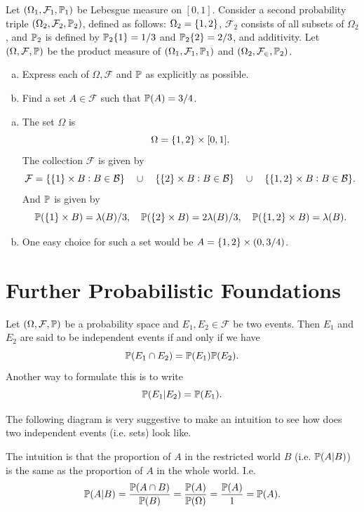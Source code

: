 \begin{problem}
	Let $ (\Omega_1,\mathcal{F}_1,\mathbb{P}_1) $ be Lebesgue measure on $ [0,1] $. Consider a second probability triple $ (\Omega_2, \mathcal{F}_2, \mathbb{P}_2) $, defined as follows: $ \Omega_2 = \{1,2\} $, $ \mathcal{F}_2 $ consists of all subsets of $ \Omega_2 $, and $ \mathbb{P}_2 $ is defined by $ \mathbb{P}_2\{1\} = 1/3 $ and $ \mathbb{P}_2\{2\} = 2/3 $, and additivity. Let $ (\Omega,\mathcal{F},\mathbb{P}) $ be the product measure of $ (\Omega_1, \mathcal{F}_1, \mathbb{P}_1) $ and $ (\Omega_2,\mathcal{F_2},\mathbb{P}_2) $.
	\begin{enumerate}[(a)]
		\item Express each of $ \Omega, \mathcal{F} $ and $ \mathbb{P} $ as explicitly as possible.
		\item Find a set $ A \in \mathcal{F} $ such that $ \mathbb{P}(A) = 3/4 $.
	\end{enumerate}
\end{problem}
\begin{solution}
	\begin{enumerate}[(a)]
		\item The set $ \Omega $ is 
		\[ \Omega = \{1,2\}\times [0,1]. \]
		The collection $ \mathcal{F} $ is given by
		\[ \mathcal{F} = \{\{1\}\times B: B \in\mathcal{B}\}\quad \cup\quad \{\{2\}\times B: B \in \mathcal{B}\} \quad\cup\quad \{\{1,2\}\times B: B \in \mathcal{B}\}. \]
		And $ \mathbb{P} $ is given by
		\[ \mathbb{P}(\{1\}\times B) = \lambda(B)/3,\quad \mathbb{P}(\{2\}\times B) = 2\lambda(B)/3,\quad \mathbb{P}(\{1,2\}\times B) = \lambda(B). \]
		\item One easy choice for such a set would be $ A = \{1,2\}\times(0,3/4) $.
	\end{enumerate}
\end{solution}
\newpage


\section{Further Probabilistic Foundations}
\begin{definition}
	Let $ (\Omega,\mathcal{F},\mathbb{P}) $ be a probability space and $ E_1,E_2 \in \mathcal{F} $ be two events. Then $ E_1 $ and $ E_2 $ are said to be independent events if and only if we have
	\[ \mathbb{P}(E_1\cap E_2) = \mathbb{P}(E_1)\mathbb{P}(E_2). \]
	Another way to formulate this is to write
	\[ \mathbb{P}(E_1 | E_2) = \mathbb{P}(E_1). \]
\end{definition}
\begin{remark}
	The following diagram is very suggestive to make an intuition to see how does two independent events (i.e. sets) look like.
	
	\FloatBarrier
	The intuition is that the proportion of $ A $ in the restricted world $ B $ (i.e. $ \mathbb{P}(A|B) $) is the same as the proportion of $ A $ in the whole world. I.e.
	\[ \mathbb{P}(A|B) = \frac{\mathbb{P}(A\cap B)}{\mathbb{P}(B)} = \frac{\mathbb{P}(A)}{\mathbb{P}(\Omega)} = \frac{\mathbb{P}(A)}{1} = \mathbb{P}(A). \]
\end{remark}

